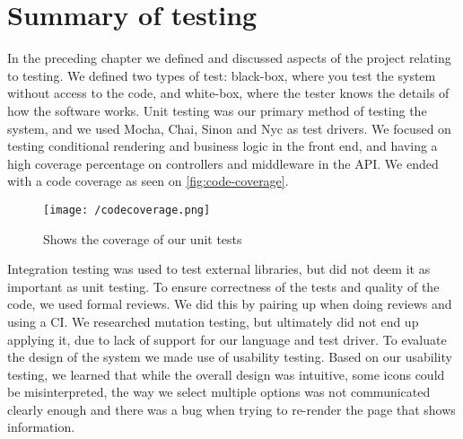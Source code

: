 \section{Summary of testing}
In the preceding chapter we defined and discussed aspects of the project relating to testing.
We defined two types of test: black-box, where you test the system without access to the code, and white-box, where the tester knows the details of how the software works.
Unit testing was our primary method of testing the system, and we used Mocha, Chai, Sinon and Nyc as test drivers.
We focused on testing conditional rendering and business logic in the front end, and having a high coverage percentage on controllers and middleware in the API.
We ended with a code coverage as seen on \autoref{fig:code-coverage}.
\begin{figure}[]
    \texttt{[image: /codecoverage.png]}
     \caption{Shows the coverage of our unit tests}
     \label{fig:code-coverage}
 \end{figure}
Integration testing was used to test external libraries, but did not deem it as important as unit testing.
To ensure correctness of the tests and quality of the code, we used formal reviews.
We did this by pairing up when doing reviews and using a CI.
We researched mutation testing, but ultimately did not end up applying it, due to lack of support for our language and test driver.
To evaluate the design of the system we made use of usability testing.
Based on our usability testing, we learned that while the overall design was intuitive, some icons could be misinterpreted, the way we select multiple options was not communicated clearly enough and there was a bug when trying to re-render the page that shows information.
